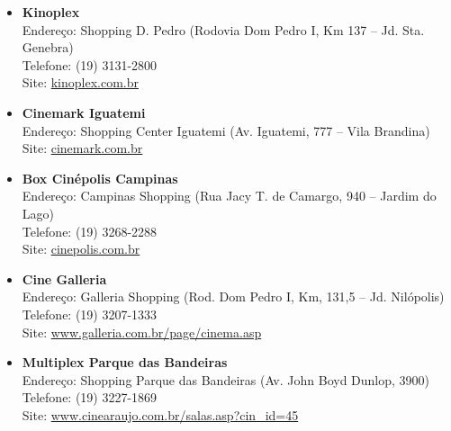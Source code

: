 \begin{itemize}
    \item   \textbf{Kinoplex}
        \\Endereço: Shopping D. Pedro (Rodovia Dom Pedro I, Km 137 -- Jd. Sta. Genebra)
        \\Telefone: (19) 3131-2800
        \\Site: \url{kinoplex.com.br}

    \item   \textbf{Cinemark Iguatemi}
        \\Endereço: Shopping Center Iguatemi (Av. Iguatemi, 777 -- Vila Brandina)
        \\Site: \url{cinemark.com.br}

    \item   \textbf{Box Cinépolis Campinas}
        \\Endereço: Campinas Shopping (Rua Jacy T. de Camargo, 940 -- Jardim do Lago)
        \\Telefone: (19) 3268-2288
        \\Site: \url{cinepolis.com.br}

    \item   \textbf{Cine Galleria}
        \\Endereço: Galleria Shopping (Rod. Dom Pedro I, Km, 131,5 -- Jd. Nilópolis)
        \\Telefone: (19) 3207-1333
        \\Site: \url{www.galleria.com.br/page/cinema.asp}


    
    \item   \textbf{Multiplex Parque das Bandeiras}
		\\Endereço: Shopping Parque das Bandeiras (Av. John Boyd Dunlop, 3900)
		\\Telefone: (19) 3227-1869
		\\Site: \url{www.cinearaujo.com.br/salas.asp?cin_id=45}
		

\end{itemize}
